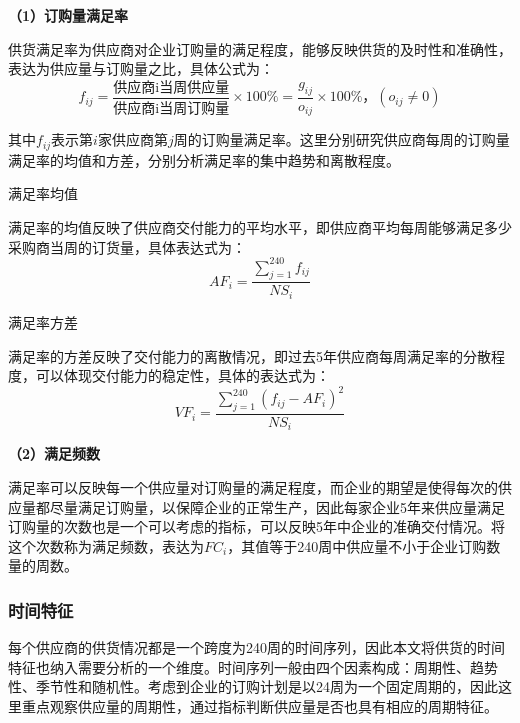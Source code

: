 \documentclass[withoutpreface,bwprint]{cumcmthesis} %
\begin{document}
\begin{spacing}{1.8}\textbf{（1）订购量满足率}\end{spacing}
供货满足率为供应商对企业订购量的满足程度，能够反映供货的及时性和准确性，表达为供应量与订购量之比，具体公式为：
\begin{equation}
    f_{i j}=\frac{\text{供应商i当周供应量}}{\text{供应商i当周订购量}}\times 100\%=\frac{g_{i j}}{o_{i j}}\times 100\%\text{，} \left(o_{i j}\neq 0\right)
\end{equation}

其中$f_{i j}$表示第$i$家供应商第$j$周的订购量满足率。这里分别研究供应商每周的订购量满足率的均值和方差，分别分析满足率的集中趋势和离散程度。

 满足率均值

满足率的均值反映了供应商交付能力的平均水平，即供应商平均每周能够满足多少采购商当周的订货量，具体表达式为：
\begin{equation}
    AF_i=\frac{\sum_{j = 1}^{240}f_{i j}}{NS_i}
\end{equation}

 满足率方差

满足率的方差反映了交付能力的离散情况，即过去5年供应商每周满足率的分散程度，可以体现交付能力的稳定性，具体的表达式为：
\begin{equation}
    VF_i=\frac{\sum_{j = 1}^{240}\left(f_{i j}-AF_i\right)^2 }{NS_i}
\end{equation}

\begin{spacing}{1.8}\textbf{（2）满足频数}\end{spacing}
满足率可以反映每一个供应量对订购量的满足程度，而企业的期望是使得每次的供应量都尽量满足订购量，以保障企业的正常生产，因此每家企业5年来供应量满足订购量的次数也是一个可以考虑的指标，可以反映5年中企业的准确交付情况。将这个次数称为满足频数，表达为$FC_i$，其值等于240周中供应量不小于企业订购数量的周数。

\subsubsection{时间特征}%
每个供应商的供货情况都是一个跨度为240周的时间序列，因此本文将供货的时间特征也纳入需要分析的一个维度。时间序列一般由四个因素构成：周期性、趋势性、季节性和随机性。考虑到企业的订购计划是以24周为一个固定周期的，因此这里重点观察供应量的周期性，通过指标判断供应量是否也具有相应的周期特征。
\end{document}
